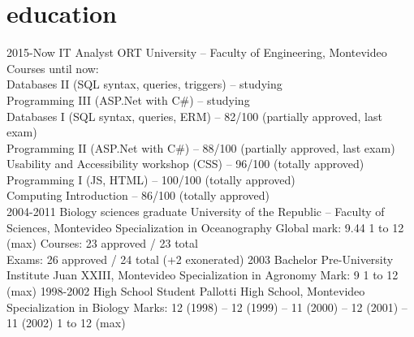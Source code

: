 \documentclass[]{friggeri-cv} %
\begin{document}
\section{education}

\begin{entrylist}

 \entry
 {2015-Now}
 {IT Analyst}
 {ORT University -- Faculty of Engineering, Montevideo}
 {Courses until now:\\
 	Databases II (SQL syntax, queries, triggers) -- studying\\
 	Programming III (ASP.Net with C\#) -- studying\\ 	 
 	Databases I (SQL syntax, queries, ERM) -- 82/100 (partially approved, last exam)\\
 	Programming II (ASP.Net with C\#) -- 88/100 (partially approved, last exam)\\
 	Usability and Accessibility workshop (CSS) -- 96/100 (totally approved)\\
 	Programming I (JS, HTML) -- 100/100 (totally approved)\\
 	Computing Introduction -- 86/100 (totally approved)\\
 	}	 
 \entry
 {2004-2011}
 {Biology sciences graduate}
 {University of the Republic -- Faculty of Sciences, Montevideo}
 {Specialization in Oceanography}
 \entry
 {}
 {\normalfont Global mark: 9.44}
 {1 to 12 (max)}  
 {Courses: {23 approved} / {23 total}\\
  Exams: {26 approved} / {24 total} (+2 exonerated)} 
 \entry
 {2003}
 {Bachelor}
 {Pre-University Institute Juan XXIII, Montevideo}
 {Specialization in Agronomy}
 \entry
 {}
 {\normalfont Mark: 9}
 {1 to 12 (max)}
 {} 
 \entry
 {1998-2002}
 {High School Student}
 {Pallotti High School, Montevideo}
 {Specialization in Biology}
 \entry
 {}
 {\normalfont Marks: 12 (1998) -- 12 (1999) -- 11 (2000) -- 12 (2001) -- 11 (2002)}
 {1 to 12 (max)}
 {}
\end{entrylist}

\end{document}
